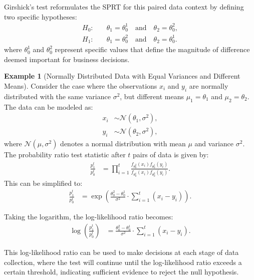\documentclass[magisterska, english]{pwr_wmat_praca_dyplomowa}
\theoremstyle{plain}
\numberwithin{theorem}{chapter}
\theoremstyle{definition}
\numberwithin{theorem}{chapter}
\newtheorem{example}[theorem]{Example}
\begin{document}
Girshick's test reformulates the SPRT for this paired data context by defining two specific hypotheses:
\begin{align*}
	H_0: &\quad \theta_1 = \theta_0^1 \quad \text{and} \quad \theta_2 = \theta_0^2, \\
	H_1: &\quad \theta_1 = \theta_0^2 \quad \text{and} \quad \theta_2 = \theta_0^1.
\end{align*}
where \(\theta_0^1\) and \(\theta_0^2\) represent specific values that define the magnitude of difference deemed important for business decisions.

\begin{example}[Normally Distributed Data with Equal Variances and Different Means]
	
	
	Consider the case where the observations \(x_i\) and \(y_i\) are normally distributed with the same variance \(\sigma^2\), but different means \(\mu_1 = \theta_1\) and \(\mu_2 = \theta_2\). The data can be modeled as:
	\begin{align*}
		x_i &\sim \mathcal{N}(\theta_1, \sigma^2), \\
		y_i &\sim \mathcal{N}(\theta_2, \sigma^2),
	\end{align*}
	where \(\mathcal{N}(\mu, \sigma^2)\) denotes a normal distribution with mean \(\mu\) and variance \(\sigma^2\).
	The probability ratio test statistic after \(t\) pairs of data is given by:
	\begin{align*}
		\frac{p_1^t}{p_0^t} &= \prod_{i=1}^{t} \frac{f_{\theta_0^2}(x_i) f_{\theta_0^1}(y_i)}{f_{\theta_0^1}(x_i) f_{\theta_0^2}(y_i)}.
	\end{align*}
	This can be simplified to:
	\begin{align*}
		\frac{p_1^t}{p_0^t} &= \exp\left(\frac{\theta_0^2 - \theta_0^1}{\sigma^2} \cdot \sum_{i=1}^{t} (x_i - y_i)\right).
	\end{align*}
	
	Taking the logarithm, the log-likelihood ratio becomes:
	\begin{align*}
		\log \left(\frac{p_1^t}{p_0^t}\right) &= \frac{\theta_0^2 - \theta_0^1}{\sigma^2} \cdot \sum_{i=1}^{t} (x_i - y_i).
	\end{align*}
	
	This log-likelihood ratio can be used to make decisions at each stage of data collection, where the test will continue until the log-likelihood ratio exceeds a certain threshold, indicating sufficient evidence to reject the null hypothesis.
\end{example}
\end{document}
